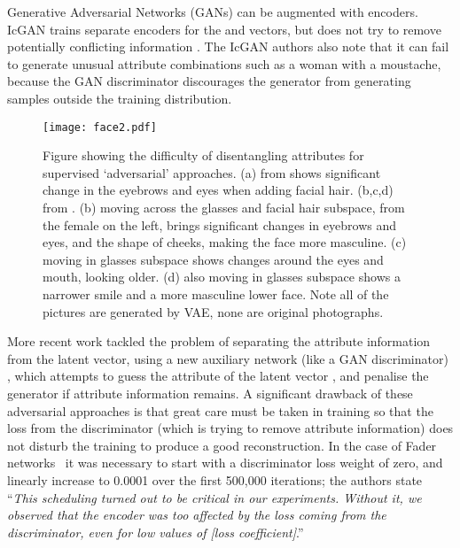 \documentclass{article}
\begin{document}
Generative Adversarial Networks (GANs) can be augmented with encoders. IcGAN  trains separate encoders for the  and  vectors, but does not try to remove potentially conflicting information \cite{DBLP:journals/corr/PerarnauWRA16}. The IcGAN authors also note that it can fail to generate unusual attribute combinations such as a woman with a moustache, because the GAN discriminator  discourages the generator from generating samples outside the training distribution.
  
\begin{figure}[htb]
    \centering
    \texttt{[image: face2.pdf]}
    \caption{Figure showing the  difficulty of disentangling attributes for  supervised `adversarial' approaches.
    (a) from \citet{CreswellCondVAE-info} shows significant change in the eyebrows and eyes when adding facial hair. (b,c,d) from \citet{Klys2018NIPS}. (b) moving across the glasses and facial hair subspace, from the female on the left, brings significant changes in eyebrows and eyes, and the shape of cheeks, making the face more masculine. (c) moving in glasses subspace shows changes around the eyes and mouth, looking older. (d) also moving in glasses subspace shows a narrower smile and a more masculine lower face.
    Note all of the pictures are generated by VAE, none are original photographs.}
    \label{otherim}
\end{figure}  
  
More recent work tackled the problem of separating the attribute information from the latent vector, using a new auxiliary network  (like a GAN  discriminator)  \cite{NIPS2017_7178,CreswellCondVAE-info,Klys2018NIPS},  which attempts to guess the attribute of the latent vector , and penalise the generator if attribute information remains. A significant drawback of these  adversarial approaches is that great care must be taken in training so that the loss from the discriminator (which is trying to remove attribute information) does not disturb the training to produce a good reconstruction. In the case of 
Fader networks~\cite{NIPS2017_7178} it was necessary to start with a discriminator loss weight of zero, and linearly increase to 0.0001 over the first 500,000 iterations; the authors state ``\textit{This scheduling turned out to be critical in our experiments.
Without it, we observed that the encoder was too affected by the loss coming from the discriminator, even for low values of [loss coefficient]}.''
\end{document}
